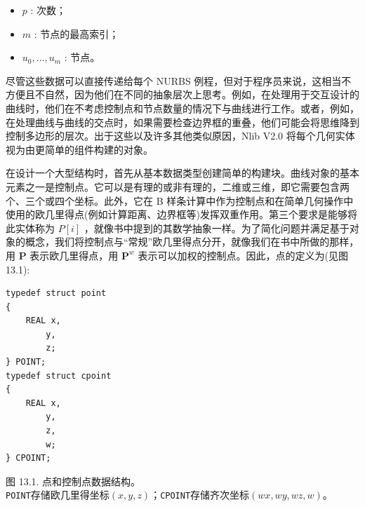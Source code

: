 \documentclass[../main.tex]{subfiles}
\begin{document}
\begin{itemize}
\item \(p\) : 次数；
\end{itemize}

\begin{itemize}
\item \(m\) : 节点的最高索引；
\end{itemize}

\begin{itemize}
\item \({u}_{0},\ldots ,{u}_{m}\) : 节点。
\end{itemize}

尽管这些数据可以直接传递给每个 NURBS 例程，但对于程序员来说，这相当不方便且不自然，因为他们在不同的抽象层次上思考。例如，在处理用于交互设计的曲线时，他们在不考虑控制点和节点数量的情况下与曲线进行工作。或者，例如，在处理曲线与曲线的交点时，如果需要检查边界框的重叠，他们可能会将思维降到控制多边形的层次。出于这些以及许多其他类似原因，Nlib V2.0 将每个几何实体视为由更简单的组件构建的对象。

在设计一个大型结构时，首先从基本数据类型创建简单的构建块。曲线对象的基本元素之一是控制点。它可以是有理的或非有理的，二维或三维，即它需要包含两个、三个或四个坐标。此外，它在 B 样条计算中作为控制点和在简单几何操作中使用的欧几里得点(例如计算距离、边界框等)发挥双重作用。第三个要求是能够将此实体称为 \(P\left\lbrack  i\right\rbrack\) ，就像书中提到的其数学抽象一样。为了简化问题并满足基于对象的概念，我们将控制点与“常规”欧几里得点分开，就像我们在书中所做的那样，用 \(\mathbf{P}\) 表示欧几里得点，用 \({\mathbf{P}}^{w}\) 表示可以加权的控制点。因此，点的定义为(见图 13.1):

\begin{verbatim}
typedef struct point
{
    REAL x,
        y,
        z;
} POINT;
typedef struct cpoint
{
    REAL x,
        y,
        z,
        w;
} CPOINT;
\end{verbatim}

\begin{center}
\begin{minipage}{14cm}
\centering
{}
\par\smallskip
图 13.1. 点和控制点数据结构。\\
\texttt{POINT}存储欧几里得坐标$(x,y,z)$；\texttt{CPOINT}存储齐次坐标$(wx,wy,wz,w)$。
\end{minipage}
\end{center}
\end{document}
